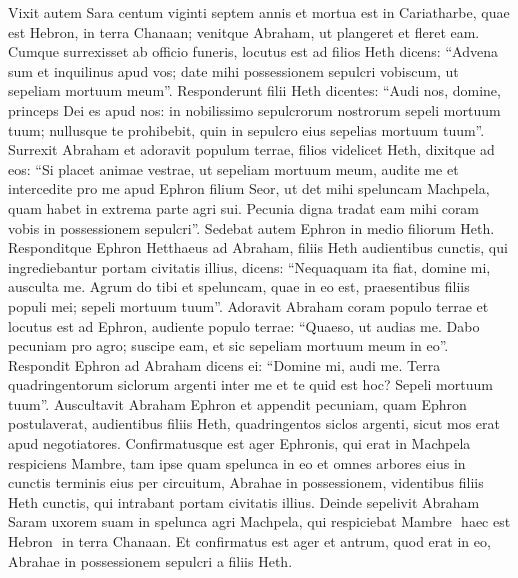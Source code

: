 \begin{biblechapter}  
\verse Vixit autem Sara centum viginti septem annis 
\verse et mortua est in Cariatharbe, quae est Hebron, in terra Chanaan; venitque Abraham, ut plangeret et fleret eam. 
\verse Cumque surrexisset ab officio funeris, locutus est ad filios Heth dicens: 
\verse “Advena sum et inquilinus apud vos; date mihi possessionem sepulcri vobiscum, ut sepeliam mortuum meum”. 
\verse Responderunt filii Heth dicentes: 
\verse “Audi nos, domine, princeps Dei es apud nos: in nobilissimo sepulcrorum nostrorum sepeli mortuum tuum; nullusque te prohibebit, quin in sepulcro eius sepelias mortuum tuum”. 
\verse Surrexit Abraham et adoravit populum terrae, filios videlicet Heth, 
\verse dixitque ad eos: “Si placet animae vestrae, ut sepeliam mortuum meum, audite me et intercedite pro me apud Ephron filium Seor, 
\verse ut det mihi speluncam Machpela, quam habet in extrema parte agri sui. Pecunia digna tradat eam mihi coram vobis in possessionem sepulcri”. 
\verse Sedebat autem Ephron in medio filiorum Heth. Responditque Ephron Hetthaeus ad Abraham, filiis Heth audientibus cunctis, qui ingrediebantur portam civitatis illius, dicens: 
\verse “Nequaquam ita fiat, domine mi, ausculta me. Agrum do tibi et speluncam, quae in eo est, praesentibus filiis populi mei; sepeli mortuum tuum”. 
\verse Adoravit Abraham coram populo terrae 
\verse et locutus est ad Ephron, audiente populo terrae: “Quaeso, ut audias me. Dabo pecuniam pro agro; suscipe eam, et sic sepeliam mortuum meum in eo”. 
\verse Respondit Ephron ad Abraham dicens ei: 
\verse “Domine mi, audi me. Terra quadringentorum siclorum argenti inter me et te quid est hoc? Sepeli mortuum tuum”. 
\verse Auscultavit Abraham Ephron et appendit pecuniam, quam Ephron postulaverat, audientibus filiis Heth, quadringentos siclos argenti, sicut mos erat apud negotiatores. 
\verse Confirmatusque est ager Ephronis, qui erat in Machpela respiciens Mambre, tam ipse quam spelunca in eo et omnes arbores eius in cunctis terminis eius per circuitum, 
\verse Abrahae in possessionem, videntibus filiis Heth cunctis, qui intrabant portam civitatis illius. 
\verse Deinde sepelivit Abraham Saram uxorem suam in spelunca agri Machpela, qui respiciebat Mambre ­ haec est Hebron ­ in terra Chanaan. 
\verse Et confirmatus est ager et antrum, quod erat in eo, Abrahae in possessionem sepulcri a filiis Heth. 
\end{biblechapter}


